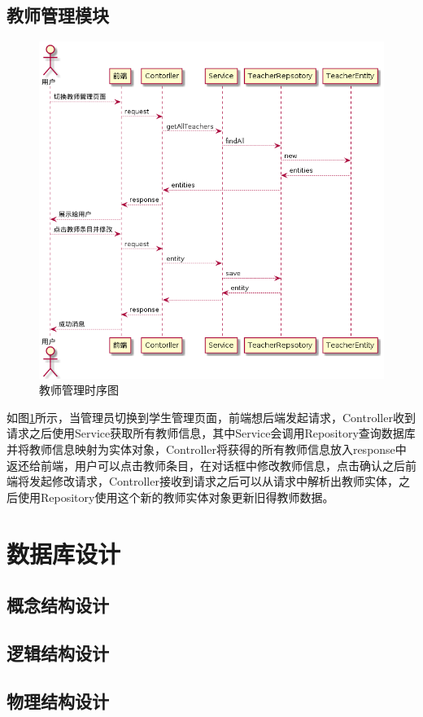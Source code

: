 \subsection{教师管理模块}

\begin{figure}
    \centering
    \includegraphics[scale = 0.6]{out/uml/时序图/manage-teacher-sequence/manage-teacher-sequence.png}
    \caption{\song\wuhao 教师管理时序图}
    \label{manage-teacher-sequence}
\end{figure}

如图\ref{manage-teacher-sequence}所示，当管理员切换到学生管理页面，前端想后端发起请求，Controller收到请求之后使用Service获取所有教师信息，其中Service会调用Repository查询数据库并将教师信息映射为实体对象，Controller将获得的所有教师信息放入response中返还给前端，用户可以点击教师条目，在对话框中修改教师信息，点击确认之后前端将发起修改请求，Controller接收到请求之后可以从请求中解析出教师实体，之后使用Repository使用这个新的教师实体对象更新旧得教师数据。

\section{数据库设计}
\subsection{概念结构设计}
\subsection{逻辑结构设计}
\subsection{物理结构设计}


